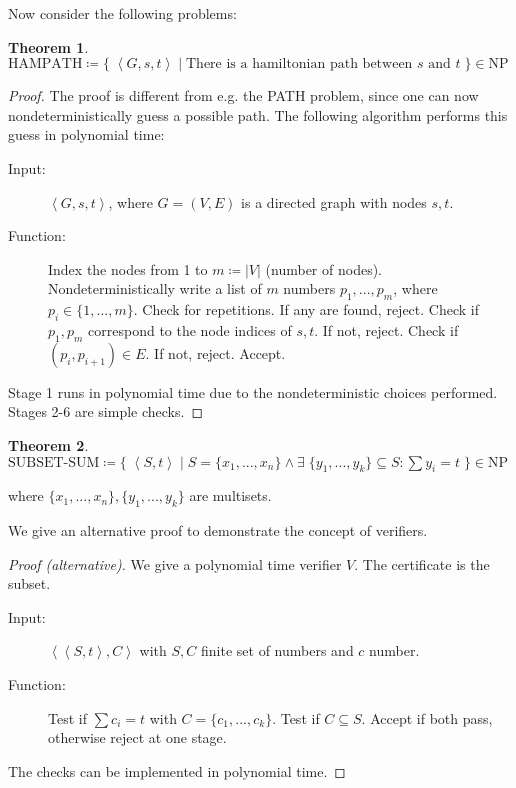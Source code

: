 \documentclass[10pt,fleqn]{article}
\theoremstyle{definition}
\newtheorem{theorem}{Theorem}
\theoremstyle{remark}
\newcommand{\npclass}{\text{NP}}
\newcommand{\hampathprob}{\text{HAMPATH}}
\newcommand{\subsetsumprob}{\text{SUBSET-SUM}}
\newcommand{\lpp}{\left \langle}
\newcommand{\rpp}{\right \rangle}
\newcommand{\enc}[1]{\lpp #1 \rpp}
\begin{document}
Now consider the following problems:
\begin{theorem}
    \(
    \hampathprob \coloneqq \{ \; \enc{G, s, t} \mid \text{There is a hamiltonian path between } s \text{ and } t \; \} \in \npclass
    \)
\end{theorem}
\begin{proof} The proof is different from e.g. the PATH problem, since one can now nondeterministically guess a possible path. The following algorithm performs this guess in polynomial time:

    \begin{description}
        \item[Input:] \(\enc{G, s, t}\), where \(G = (V, E)\) is a directed graph with nodes \(s, t\).
        \item[Function:] \phantom{}
              \begin{algorithmic}[1]
                  \State Index the nodes from 1 to \(m \coloneqq |V|\) (number of nodes). Nondeterministically write a list of \(m\) numbers \(p_1, ..., p_m\), where \(p_i \in \{1, ..., m\}\).
                  \State Check for repetitions. If any are found, reject.
                  \State Check if \(p_1, p_m\) correspond to the node indices of \(s, t\). If not, reject.
                  \State Check if \((p_i, p_{i+1}) \in E\). If not, reject.
                  \EndFor
                  \State Accept.
              \end{algorithmic}
    \end{description}
    Stage 1 runs in polynomial time due to the nondeterministic choices performed. Stages 2-6 are simple checks.
\end{proof}
\begin{theorem}
    \(
    \subsetsumprob \coloneqq \{\; \enc{S, t} \mid S = \{x_1, ..., x_n\} \land \exists \; \{y_1,...,y_k\} \subseteq S\colon \textstyle\sum y_i = t  \;\} \in \npclass
    \)

    where \(\{x_1, ..., x_n\}, \{y_1, ..., y_k\}\) are multisets.
\end{theorem}
We give an alternative proof to demonstrate the concept of verifiers.
\begin{proof}[Proof (alternative)] We give a polynomial time verifier \(V\). The certificate is the subset.
    \begin{description}
        \item[Input:] \(\enc{\enc{S, t}, C}\) with \(S, C\) finite set of numbers and \(c\) number.
        \item[Function:] \phantom{}
              \begin{algorithmic}[1]
                  \State Test if \(\textstyle\sum c_i = t\) with \(C = \{c_1, ..., c_k\}\).
                  \State Test if \(C \subseteq S\).
                  \State Accept if both pass, otherwise reject at one stage.
              \end{algorithmic}
    \end{description}
    The checks can be implemented in polynomial time.
\end{proof}
\end{document}
